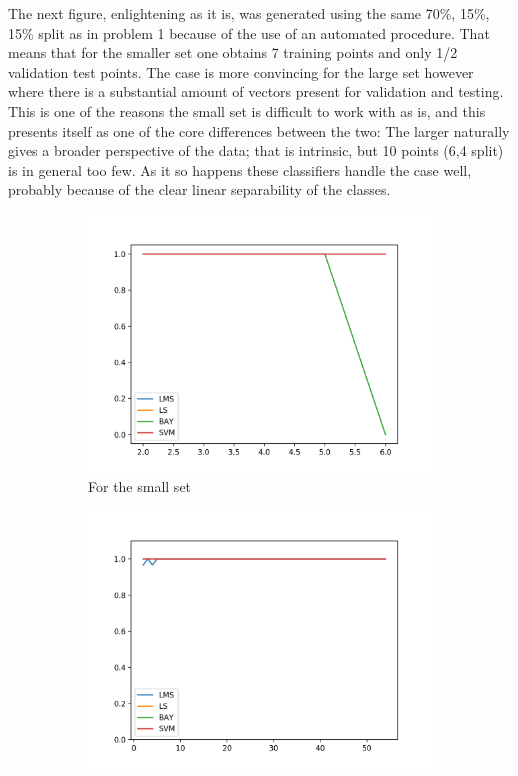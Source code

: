 \documentclass[12pt, a4paper]{article}
\begin{document}
The next figure, enlightening as it is, was generated using the same 70\%, 15\%, 15\% split as in problem 1 because of the use of an automated procedure. That means that for the smaller set one obtains  7 training points and only 1/2 validation test points. The case is more convincing for the large set however where there is a substantial amount of vectors present for validation and testing. This is one of the reasons the small set is difficult to work with as is, and this presents itself as one of the core differences between the two: The larger naturally gives a broader perspective of the data; that is intrinsic, but 10 points (6,4 split) is in general too few. As it so happens these classifiers handle the case well, probably because of the clear linear separability of the classes.

\begin{figure}[H]
    \centering
    \begin{subfigure}{0.45\textwidth}
        \includegraphics[width=\textwidth]{recursos/3/class_vs_small}
        \caption{ For the small set }
    \end{subfigure}
    \begin{subfigure}{0.45\textwidth}
        \includegraphics[width=\textwidth]{recursos/3/class_vs_large}

\end{subfigure}
\end{figure}
\end{document}
